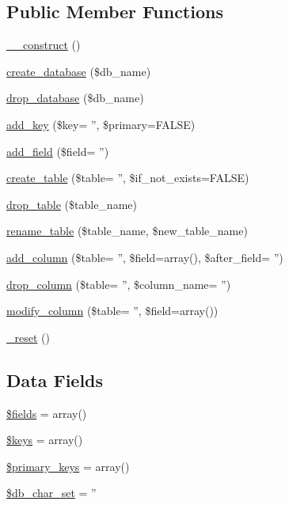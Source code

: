 \subsection*{Public Member Functions}
\begin{DoxyCompactItemize}
\item 
\hyperlink{class_c_i___d_b__forge_a095c5d389db211932136b53f25f39685}{\-\_\-\-\_\-construct} ()
\item 
\hyperlink{class_c_i___d_b__forge_a902a7267babceb2ce595706f217e00ad}{create\-\_\-database} (\$db\-\_\-name)
\item 
\hyperlink{class_c_i___d_b__forge_a9612987b2d4230de2638d15857e92e67}{drop\-\_\-database} (\$db\-\_\-name)
\item 
\hyperlink{class_c_i___d_b__forge_a0f4211b94ac209ec8b80d800234fc611}{add\-\_\-key} (\$key= '', \$primary=F\-A\-L\-S\-E)
\item 
\hyperlink{class_c_i___d_b__forge_ae7fccf8d1bd6c4fb3efa1a95be18bad7}{add\-\_\-field} (\$field= '')
\item 
\hyperlink{class_c_i___d_b__forge_ac468f94f543da8d082ea147d8a3baa3e}{create\-\_\-table} (\$table= '', \$if\-\_\-not\-\_\-exists=F\-A\-L\-S\-E)
\item 
\hyperlink{class_c_i___d_b__forge_a13a0ea391ffc0359a95766ee18ddcba9}{drop\-\_\-table} (\$table\-\_\-name)
\item 
\hyperlink{class_c_i___d_b__forge_a0fb4802acad335ebdecd921d59de9a51}{rename\-\_\-table} (\$table\-\_\-name, \$new\-\_\-table\-\_\-name)
\item 
\hyperlink{class_c_i___d_b__forge_aa1c3d03fed2c534d116f2a20db66d643}{add\-\_\-column} (\$table= '', \$field=array(), \$after\-\_\-field= '')
\item 
\hyperlink{class_c_i___d_b__forge_adb882bbb5281cf8af607730ca44b6486}{drop\-\_\-column} (\$table= '', \$column\-\_\-name= '')
\item 
\hyperlink{class_c_i___d_b__forge_adf9fa0c74698c9061709fd5eae5fbd47}{modify\-\_\-column} (\$table= '', \$field=array())
\item 
\hyperlink{class_c_i___d_b__forge_ab90fa1f6f390913fed8670e6535dc180}{\-\_\-reset} ()
\end{DoxyCompactItemize}
\subsection*{Data Fields}
\begin{DoxyCompactItemize}
\item 
\hyperlink{class_c_i___d_b__forge_ab2303c817e3b402b77b7f99627b9c319}{\$fields} = array()
\item 
\hyperlink{class_c_i___d_b__forge_af20635b6c08e03bfee9e3fc036fa80f3}{\$keys} = array()
\item 
\hyperlink{class_c_i___d_b__forge_a09349689030ba7198a094abf357c78bc}{\$primary\-\_\-keys} = array()
\item 
\hyperlink{class_c_i___d_b__forge_a6e90c3633cd0984a7e8de501f7771c53}{\$db\-\_\-char\-\_\-set} = ''
\end{DoxyCompactItemize}


